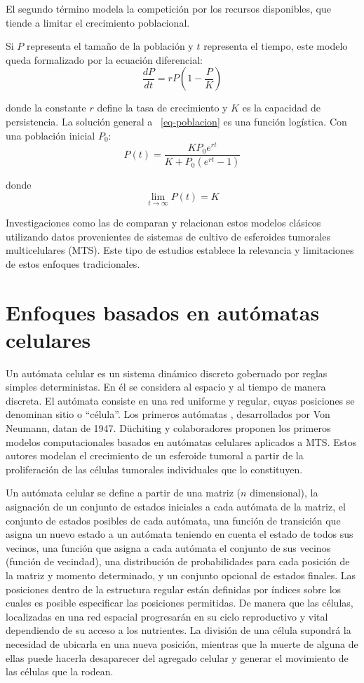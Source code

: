 El segundo término modela la competición por los recursos disponibles, que tiende a limitar el crecimiento poblacional.

Si $P$ representa el tamaño de la población y $t$ representa el tiempo, este modelo queda formalizado por la ecuación diferencial:
\begin{equation}
   \frac{dP}{dt} = rP(1 - \frac{P}{K})\label{eq-poblacion}
\end{equation}

donde la constante $r$ define la tasa de crecimiento y $K$ es la capacidad de persistencia. La soluci\'on general a ~\ref{eq-poblacion} es una funci\'on logística. Con una poblaci\'on inicial $P_{0}$:
\begin{equation}
    P(t) = \frac{KP_{0}e^{rt}}{K + P_{0}(e^{rt} - 1)}
 \end{equation}

donde 
\begin{equation}
    \lim_{t \to \infty} P(t) = K
\end{equation}

Investigaciones como las de \cite{book} comparan y relacionan estos modelos clásicos utilizando datos provenientes de sistemas de cultivo de esferoides tumorales multicelulares (MTS). Este tipo de estudios establece la relevancia y limitaciones de estos enfoques tradicionales.

\section{Enfoques basados en autómatas celulares}
Un autómata celular es un sistema dinámico discreto gobernado por reglas simples deterministas. En él se considera al espacio y al tiempo de manera discreta. El autómata consiste en una red uniforme y regular, cuyas posiciones se denominan sitio o ``célula''. Los primeros autómatas \cite{viabarre2019}, desarrollados por Von Neumann, datan de 1947. D\"uchiting y colaboradores proponen los primeros modelos computacionales basados en autómatas celulares aplicados a MTS. Estos autores modelan el crecimiento de un esferoide tumoral a partir de la proliferación de las células tumorales individuales que lo constituyen.

Un autómata celular se define a partir de una matriz ($n$ dimensional), la asignación de un conjunto de estados iniciales a cada autómata de la matriz, el conjunto de estados posibles de cada autómata, una función de transición que asigna un nuevo estado a un autómata teniendo en cuenta el estado de todos sus vecinos, una función que asigna a cada autómata el conjunto de sus vecinos (función de vecindad), una distribución de probabilidades para cada posición de la matriz y momento determinado, y un conjunto opcional de estados finales. Las posiciones dentro de la estructura regular están definidas por índices sobre los cuales es posible especificar las posiciones permitidas. De manera que las células, localizadas en una red espacial progresarán en su ciclo reproductivo y vital dependiendo de su acceso a los nutrientes. La división de una célula supondrá la necesidad de ubicarla en una nueva posición, mientras que la muerte de alguna de ellas puede hacerla desaparecer del agregado celular y generar el movimiento de las células que la rodean.

